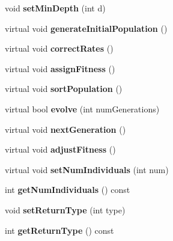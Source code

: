 \begin{DoxyCompactItemize}
void {\bfseries set\+Min\+Depth} (int d)
\item 
\hypertarget{classPopulation_aed5e025f21c935e1fd900ba60caf28fd}{}\label{classPopulation_aed5e025f21c935e1fd900ba60caf28fd} 
virtual void {\bfseries generate\+Initial\+Population} ()
\item 
\hypertarget{classPopulation_a09e29f6bbc36972a23b1985e7abacb6b}{}\label{classPopulation_a09e29f6bbc36972a23b1985e7abacb6b} 
virtual void {\bfseries correct\+Rates} ()
\item 
\hypertarget{classPopulation_ac033205445ee827a57744ae80da1d4d2}{}\label{classPopulation_ac033205445ee827a57744ae80da1d4d2} 
virtual void {\bfseries assign\+Fitness} ()
\item 
\hypertarget{classPopulation_a3374ac11fc34856b132aa8abf2921ccd}{}\label{classPopulation_a3374ac11fc34856b132aa8abf2921ccd} 
virtual void {\bfseries sort\+Population} ()
\item 
\hypertarget{classPopulation_a3c815f0afee70391b28eaacdfa84bed8}{}\label{classPopulation_a3c815f0afee70391b28eaacdfa84bed8} 
virtual bool {\bfseries evolve} (int num\+Generations)
\item 
\hypertarget{classPopulation_a3f677a82324b735a7ed093ec294ceae3}{}\label{classPopulation_a3f677a82324b735a7ed093ec294ceae3} 
virtual void {\bfseries next\+Generation} ()
\item 
\hypertarget{classPopulation_aa0975317ce7392a4d917b2b7517f28a3}{}\label{classPopulation_aa0975317ce7392a4d917b2b7517f28a3} 
virtual void {\bfseries adjust\+Fitness} ()
\item 
\hypertarget{classPopulation_ae05ed5246e8aeb4872827c8a816f3aab}{}\label{classPopulation_ae05ed5246e8aeb4872827c8a816f3aab} 
virtual void {\bfseries set\+Num\+Individuals} (int num)
\item 
\hypertarget{classPopulation_a662f89fbdae1840adf82d85786c38c10}{}\label{classPopulation_a662f89fbdae1840adf82d85786c38c10} 
int {\bfseries get\+Num\+Individuals} () const
\item 
\hypertarget{classPopulation_a4d42799a0bc164dcd442aa49a56fb172}{}\label{classPopulation_a4d42799a0bc164dcd442aa49a56fb172} 
void {\bfseries set\+Return\+Type} (int type)
\item 
\hypertarget{classPopulation_a1efef7276f278c8048de7206385691ec}{}\label{classPopulation_a1efef7276f278c8048de7206385691ec} 
int {\bfseries get\+Return\+Type} () const
\item 
\hypertarget{classPopulation_a8a9230fc234ceea29c31f2c00d9c19fe}{}\label{classPopulation_a8a9230fc234ceea29c31f2c00d9c19fe} 

\end{DoxyCompactItemize}
